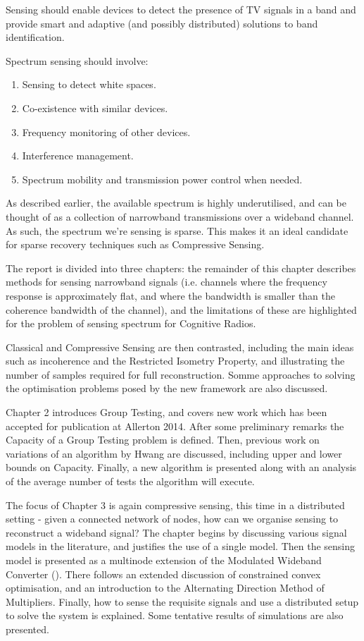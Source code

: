 Sensing should enable devices to detect the presence of TV signals in a band and provide smart and adaptive (and possibly distributed) solutions to band identification.

Spectrum sensing should involve:

\begin{enumerate}
\item Sensing to detect white spaces.
\item Co-existence with similar devices.
\item Frequency monitoring of other devices.
\item Interference management. 
\item Spectrum mobility and transmission power control when needed.
\end{enumerate}

As described earlier, the available spectrum is highly underutilised, and can be thought of as a collection of narrowband transmissions over a wideband channel. As such, the spectrum we're sensing is sparse. This makes it an ideal candidate for sparse recovery techniques such as Compressive Sensing.  

The report is divided into three chapters: the remainder of this chapter describes methods for sensing narrowband signals (i.e. channels where the frequency response is approximately flat, and where the bandwidth is smaller than the coherence bandwidth of the channel), and the limitations of these are highlighted for the problem of sensing spectrum for Cognitive Radios. 

Classical and Compressive Sensing are then contrasted, including the main ideas such as incoherence and the Restricted Isometry Property, and illustrating the number of samples required for full reconstruction.   Somme approaches to solving the optimisation problems posed by the new framework are also discussed.

Chapter 2 introduces Group Testing, and covers new work which has been accepted for publication at Allerton 2014. After some preliminary remarks the Capacity of a Group Testing problem is defined. Then, previous work on variations of an algorithm by Hwang are discussed, including upper and lower bounds on Capacity. Finally, a new algorithm is presented along with an analysis of the average number of tests the algorithm will execute.

The focus of Chapter 3 is again compressive sensing, this time in a distributed setting - given a connected network of nodes, how can we organise sensing to reconstruct a wideband signal? The chapter begins by discussing various signal models in the literature, and justifies the use of a single model. Then the sensing model is presented as a multinode extension of the Modulated Wideband Converter (\cite{mishali2010theory}). There follows an extended discussion of constrained convex optimisation, and an introduction to the Alternating Direction Method of Multipliers. Finally, how to sense the requisite signals and use a distributed setup to solve the system is explained. Some tentative results of simulations are also presented.

